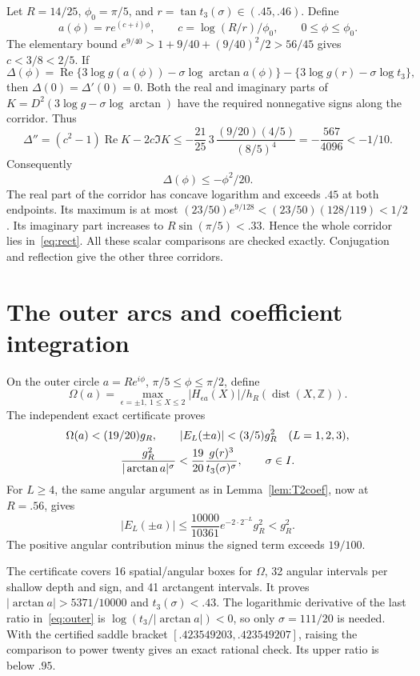 \documentclass[11pt,a4paper]{article}
\newcommand{\dist}{\operatorname{dist}}\newcommand{\Rea}{\operatorname{Re}}
\begin{document}
Let $R=14/25$, $\phi_0=\pi/5$, and $r=\tan t_3(\sigma)\in(.45,.46)$. Define
\[
 a(\phi)=r e^{(c+i)\phi},\qquad
 c=\log(R/r)/\phi_0,\qquad 0\le\phi\le\phi_0.
\]
The elementary bound $e^{9/40}>1+9/40+(9/40)^2/2>56/45$ gives $c<3/8<2/5$. If
\[
 \Delta(\phi)=\Rea\{3\log g(a(\phi))-\sigma\log\arctan a(\phi)\}
                  -\{3\log g(r)-\sigma\log t_3\},
\]
then $\Delta(0)=\Delta'(0)=0$. Both the real and imaginary parts of
$K=D^2(3\log g-\sigma\log\arctan)$ have the required nonnegative signs along the corridor. Thus
\[
 \Delta''=(c^2-1)\Rea K-2c\Im K
 \le-\frac{21}{25}\,3\,\frac{(9/20)(4/5)}{(8/5)^4}
 =-\frac{567}{4096}<-1/10.
\]
Consequently
\begin{equation}\label{eq:spiral}
 \Delta(\phi)\le-\phi^2/20.
\end{equation}
The real part of the corridor has concave logarithm and exceeds $.45$ at both endpoints. Its maximum is at most
$(23/50)e^{9/128}<(23/50)(128/119)<1/2$.
Its imaginary part increases to $R\sin(\pi/5)<.33$. Hence the whole corridor lies in~\eqref{eq:rect}. All these scalar comparisons are checked exactly. Conjugation and reflection give the other three corridors.

\section{The outer arcs and coefficient integration}
On the outer circle $a=Re^{i\phi}$, $\pi/5\le\phi\le\pi/2$, define
\[
 \Omega(a)=\max_{\epsilon=\pm1,\ 1\le X\le2}
       |H_{\epsilon a}(X)|/h_R(\dist(X,\mathbb Z)).
\]
The independent exact certificate proves
\begin{gather}\label{eq:outer}
 \Omega(a)<(19/20)g_R,\qquad
 |E_L(\pm a)|< (3/5)g_R^2\quad(L=1,2,3),\\
 \frac{g_R^2}{|\arctan a|^\sigma}
 <\frac{19}{20}\frac{g(r)^3}{t_3(\sigma)^\sigma},
 \qquad \sigma\in I.\notag
\end{gather}
For $L\ge4$, the same angular argument as in Lemma~\ref{lem:T2coef}, now at $R=.56$, gives
\[
 |E_L(\pm a)|\le\frac{10000}{10361}e^{-2\cdot2^{-L}}g_R^2<g_R^2.
\]
The positive angular contribution minus the signed term exceeds $19/100$.

The certificate covers 16 spatial/angular boxes for $\Omega$, 32 angular intervals per shallow depth and sign, and 41 arctangent intervals. It proves $|\arctan a|>5371/10000$ and $t_3(\sigma)<.43$. The logarithmic derivative of the last ratio in~\eqref{eq:outer} is $\log(t_3/|\arctan a|)<0$, so only $\sigma=111/20$ is needed. With the certified saddle bracket $[.423549203,.423549207]$, raising the comparison to power twenty gives an exact rational check. Its upper ratio is below $.95$.
\end{document}
